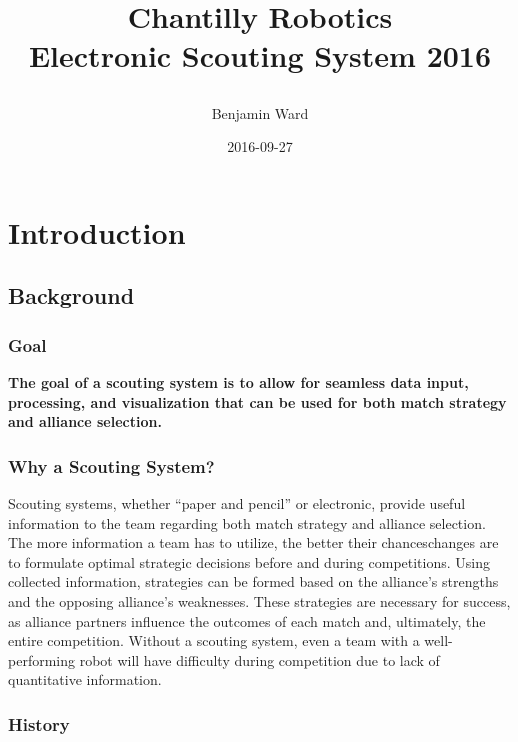 \documentclass[11pt]{report}
\title{ \protect\parbox{\textwidth}{\protect\centering Chantilly Robotics\\ Electronic Scouting System 2016}}
\date{2016-09-27}
\author{Benjamin Ward}
\begin{document}
\begin{titlingpage}
\maketitle
\end{titlingpage}

\newpage

\tableofcontents

\newpage


\chapter{Introduction}

\section{Background}

\subsection{Goal}

\textbf{The goal of a scouting system is to allow for seamless data input, processing, and visualization that can be used for both match strategy and alliance selection.}

\subsection{Why a Scouting System?}

Scouting systems, whether “paper and pencil” or electronic, provide useful information to the team regarding both match strategy and alliance selection. The more information a team has to utilize, the better their chanceschanges are to formulate optimal strategic decisions before and during competitions. Using collected information, strategies can be formed based on the alliance’s strengths and the opposing alliance’s weaknesses. These strategies are necessary for success, as alliance partners influence the outcomes of each match and, ultimately, the entire competition. Without a scouting system, even a team with a well-performing robot will have difficulty during competition due to lack of quantitative information. 

\subsection{History}
\end{document}
